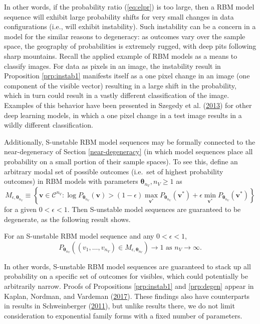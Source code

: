 \documentclass[12pt]{article}
\theoremstyle{definition}
\newcommand{\nv}{{n_{\scriptscriptstyle V}}}
\let\BeginKnitrBlock\begin \let\EndKnitrBlock\end
\begin{document}
In other words, if the probability ratio (\eqref{eq:elpr}) is too large,
then a RBM model sequence will exhibit large probability shifts for very
small changes in data configurations (i.e., will exhibit instability).
Such instability can be a concern in a model for the similar reasons to
degeneracy: as outcomes vary over the sample space, the geography of
probabilities is extremely rugged, with deep pits following sharp
mountains. Recall the applied example of RBM models as a means to
classify images. For data as pixels in an image, the instability result
in Proposition \ref{prp:instab1} manifests itself as a one pixel change
in an image (one component of the visible vector) resulting in a large
shift in the probability, which in turn could result in a vastly
different classification of the image. Examples of this behavior have
been presented in Szegedy et al.
(\protect\hyperlink{ref-szegedy2013intriguing}{2013}) for other deep
learning models, in which a one pixel change in a test image results in
a wildly different classification.

Additionally, S-unstable RBM model sequences may be formally connected
to the near-degeneracy of Section \ref{near-degeneracy} (in which model
sequences place all probability on a small portion of their sample
spaces). To see this, define an arbitrary modal set of possible outcomes
(i.e.~set of highest probability outcomes) in RBM models with parameters
\(\boldsymbol \theta_\nv, \nv \ge 1\) as \[
M_{\epsilon, \boldsymbol \theta_\nv} \equiv \left\{\boldsymbol v \in \mathcal{C}^\nv: \log P_{\boldsymbol \theta_\nv}(\boldsymbol v) > (1-\epsilon)\max\limits_{\boldsymbol v^*}P_{\boldsymbol \theta_\nv}(\boldsymbol v^*) + \epsilon\min\limits_{\boldsymbol v^*}P_{\boldsymbol \theta_\nv}(\boldsymbol v^*) \right\}
\] for a given \(0 < \epsilon < 1\). Then S-unstable model sequences are
guaranteed to be degenerate, as the following result shows.

\BeginKnitrBlock{proposition}
\protect\hypertarget{prp:degen}{}{\label{prp:degen}}For an S-unstable RBM
model sequence and any \(0 < \epsilon < 1\), \[
P_{\boldsymbol \theta_\nv}\left((v_1, \dots, v_\nv) \in M_{\epsilon, \boldsymbol \theta_\nv}\right) \rightarrow 1 \text{ as } \nv \rightarrow \infty.
\]
\EndKnitrBlock{proposition}

In other words, S-unstable RBM model sequences are guaranteed to stack
up all probability on a specific set of outcomes for visibles, which
could potentially be arbitrarily narrow. Proofs of Propositions
\ref{prp:instab1} and \ref{prp:degen} appear in Kaplan, Nordman, and
Vardeman (\protect\hyperlink{ref-kaplan2017note}{2017}). These findings
also have counterparts in results in Schweinberger
(\protect\hyperlink{ref-schweinberger2011instability}{2011}), but unlike
results there, we do not limit consideration to exponential family forms
with a fixed number of parameters.
\end{document}
